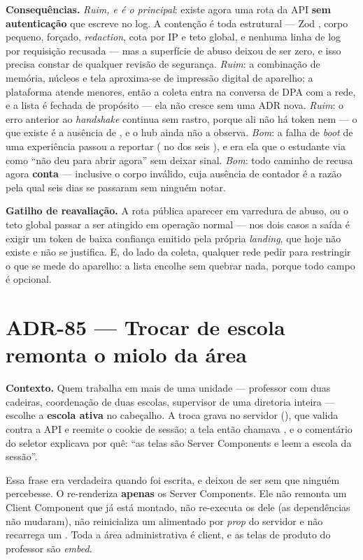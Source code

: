 \textbf{Consequências.} \emph{Ruim, e é o principal}: existe agora uma rota da
API \textbf{sem autenticação} que escreve no log. A contenção é toda estrutural
--- Zod , corpo pequeno,  forçado, \emph{redaction},
cota por IP e teto global, e nenhuma linha de log por requisição recusada --- mas
a superfície de abuso deixou de ser zero, e isso precisa constar de qualquer
revisão de segurança. \emph{Ruim}: a combinação de memória, núcleos e tela
aproxima-se de impressão digital de aparelho; a plataforma atende menores, então
a coleta entra na conversa de DPA com a rede, e a lista é fechada de propósito
--- ela não cresce sem uma ADR nova. \emph{Ruim}: o erro anterior ao
\emph{handshake} continua sem rastro, porque ali não há token nem 
--- o que existe é a ausência de , e o hub ainda não a observa.
\emph{Bom}: a falha de \emph{boot} de uma experiência passou a reportar
( no  dos seis ), e era ela
que o estudante via como \enquote{não deu para abrir agora} sem deixar sinal.
\emph{Bom}: todo caminho de recusa agora \textbf{conta} --- inclusive o corpo
inválido, cuja ausência de contador é a razão pela qual seis dias se passaram
sem ninguém notar.

\textbf{Gatilho de reavaliação.} A rota pública aparecer em varredura de abuso,
ou o teto global passar a ser atingido em operação normal --- nos dois casos a
saída é exigir um token de baixa confiança emitido pela própria \emph{landing},
que hoje não existe e não se justifica. E, do lado da coleta, qualquer rede pedir
para restringir o que se mede do aparelho: a lista encolhe sem quebrar nada,
porque todo campo é opcional.

\section{ADR-85 --- Trocar de escola \textbf{remonta} o miolo da área}
\label{adr:escopo-da-escola}

\textbf{Contexto.} Quem trabalha em mais de uma unidade --- professor com duas
cadeiras, coordenação de duas escolas, supervisor de uma diretoria inteira ---
escolhe a \textbf{escola ativa} no cabeçalho. A troca grava no servidor
(), que valida contra a API e reemite o cookie de
sessão; a tela então chamava , e o comentário do seletor
explicava por quê: \enquote{as telas são Server Components e leem a escola da
sessão}.

Essa frase era verdadeira quando foi escrita, e deixou de ser sem que ninguém
percebesse. O  re-renderiza \textbf{apenas} os Server
Components. Ele não remonta um Client Component que já está montado, não
re-executa os  dele (as dependências não mudaram), não
reinicializa um  alimentado por \emph{prop} do servidor e não
recarrega um . Toda a área administrativa é client, e as telas de
produto do professor são \emph{embed}.


